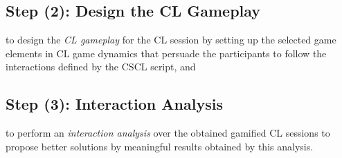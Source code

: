 





\subsection{Step (2): Design the CL Gameplay}

to design the \emph{CL gameplay} for the CL session by setting up the selected game elements in CL game dynamics that persuade the participants to follow the interactions defined by the CSCL script, and


\subsection{Step (3): Interaction Analysis}

to perform an \emph{interaction analysis} over the obtained gamified CL sessions to propose better solutions by meaningful results obtained by this analysis.


 


